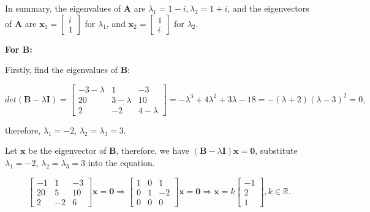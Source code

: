 \documentclass[12pt, a4paper, UTF8]{ctexart}
\begin{document}
\begin{enumerate}
		In summary, the eigenvalues of $\bm{A}$ are $\lambda_1=1-i,\lambda_2=1+i$, and the eigenvectors of $\bm{A}$ are 
		$ \bm{x}_{1}=\begin{bmatrix}
			i\\
			1
		\end{bmatrix}$ for $\lambda_1$, and 
		$\bm{x}_{2}=\begin{bmatrix}
			1\\
			i
		\end{bmatrix}$ for $\lambda_2$.

		\textbf{For $\bm{B}$:}

		Firstly, find the eigenvalues of $\bm{B}$:

		\begin{equation*}
			det(\bm{B}-\lambda\bm{I})=
			\begin{bmatrix}
			-3-\lambda	& 1 & -3\\
			20	&3 -\lambda & 10\\
			2	& -2 &4-\lambda
			\end{bmatrix}=-\lambda^{3}+4\lambda^{2}+3\lambda-18=-(\lambda+2)(\lambda-3)^{2}=0, 
		\end{equation*}

		therefore, $\lambda_{1}=-2$, $\lambda_{2}=\lambda_{3}=3$.

		Let $\bm{x}$ be the eigenvector of $\bm{B}$, therefore, we have $(\bm{B}-\lambda\bm{I})\bm{x}=\bm{0}$, substitute $\lambda_{1}=-2$, $\lambda_{2}=\lambda_{3}=3$ into the equation.

		\begin{equation*}
			\begin{bmatrix}
				-1	& 1  & -3\\
				20	& 5  & 10\\
				2	& -2 & 6
			\end{bmatrix}\bm{x} = \bm{0} \Longrightarrow \begin{bmatrix}
				1 & 0 & 1\\
				0 & 1 & -2\\
				0 & 0 & 0
			\end{bmatrix}\bm{x} = \bm{0} \Longrightarrow \bm{x} = k \begin{bmatrix}
				-1 \\ 2 \\ 1
			\end{bmatrix}, k \in \mathbb{R}.
		\end{equation*}


\end{enumerate}
\end{document}
